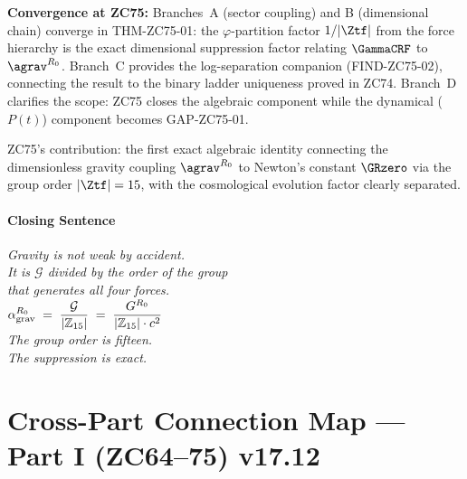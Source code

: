 \documentclass[12pt, a4paper]{article}
\begin{document}
\begin{genealogybox}[title={How ZC75's Key Objects Trace Back}]
\textbf{Convergence at ZC75:}
Branches~A (sector coupling) and B (dimensional chain) converge
in THM-ZC75-01: the $\varphi$-partition factor $1/|\Ztf|$ from
the force hierarchy is the exact dimensional suppression factor
relating $\GammaCRF$ to $\agrav^{R_0}$.
Branch~C provides the log-separation companion (FIND-ZC75-02),
connecting the result to the binary ladder uniqueness proved in ZC74.
Branch~D clarifies the scope: ZC75 closes the algebraic component
while the dynamical ($P(t)$) component becomes GAP-ZC75-01.

ZC75's contribution: the first exact algebraic identity connecting
the dimensionless gravity coupling $\agrav^{R_0}$ to Newton's
constant $\GRzero$ via the group order $|\Ztf| = 15$, with
the cosmological evolution factor clearly separated.
\end{genealogybox}

\subsection{Closing Sentence}

\bigskip
\begin{center}
\textit{%
  Gravity is not weak by accident.\\[0.4em]
  It is $\mathcal{G}$ divided by the order of the group\\
  that generates all four forces.\\[0.5em]
  $\displaystyle
  \alpha_{\rm grav}^{R_0}
  \;=\; \frac{\mathcal{G}}{|\mathbb{Z}_{15}|}
  \;=\; \frac{G^{R_0}}{|\mathbb{Z}_{15}|\cdot c^2}$\\[0.5em]
  The group order is fifteen.\\
  The suppression is exact.
}
\end{center}





\part{Cross-Part Connection Map --- Part I (ZC64--75) v17.12}
\label{part:zc64-75-conmap}
\end{document}
